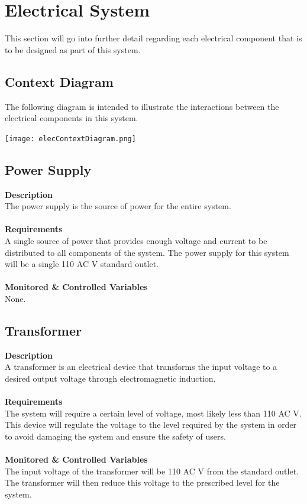 \documentclass[titlepage]{article}
\begin{document}
\section{Electrical System}
This section will go into further detail regarding each electrical component that is to be designed as part of this system.
\subsection{Context Diagram}
The following diagram is intended to illustrate the interactions between the electrical components in this system.
\begin{center}
	\texttt{[image: elecContextDiagram.png]}
\label{fig:elecContextDiagramFig}
\end{center}

\subsection{Power Supply}
\textbf{Description}\\
The power supply is the source of power for the entire system.\\\\
\textbf{Requirements}\\
A single source of power that provides enough voltage and current to be distributed to all components of the system. The power supply for this system will be a single 110 AC V standard outlet.\\\\
\textbf{Monitored \& Controlled Variables}\\
None.

\subsection{Transformer}
\textbf{Description}\\
A transformer is an electrical device that transforms the input voltage to a desired output voltage through electromagnetic induction.\\\\
\textbf{Requirements}\\
The system will require a certain level of voltage, most likely less than 110 AC V. This device will regulate the voltage to the level required by the system in order to avoid damaging the system and ensure the safety of users.\\\\
\textbf{Monitored \& Controlled Variables}\\
The input voltage of the transformer will be 110 AC V from the standard outlet. The transformer will then reduce this voltage to the prescribed level for the system.
\end{document}

